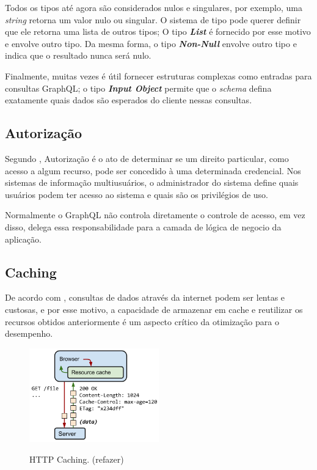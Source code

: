 Todos os tipos até agora são considerados nulos e singulares, por exemplo,  uma \textit{string} retorna um valor nulo ou singular. O sistema de tipo pode querer definir que ele retorna uma lista de outros tipos; O tipo \textit{\textbf{List}} é fornecido por esse motivo e envolve outro tipo. Da mesma forma, o tipo \textit{\textbf{Non-Null}} envolve outro tipo e indica que o resultado nunca será nulo.

Finalmente, muitas vezes é útil fornecer estruturas complexas como entradas para consultas GraphQL; o tipo \textit{\textbf{Input Object}} permite que o \textit{schema} defina exatamente quais dados são esperados do cliente nessas consultas.


\subsection{Autorização}

Segundo , Autorização é o ato de determinar se um direito particular, como acesso a algum recurso, pode ser concedido à uma determinada credencial. Nos sistemas de informação multiusuários, o administrador do sistema define quais usuários podem ter acesso ao sistema e quais são os privilégios de uso.

Normalmente o GraphQL não controla diretamente o controle de acesso, em vez disso, delega essa responsabilidade para a camada de lógica de negocio da aplicação. 


\subsection{Caching}

De acordo com , consultas de dados através da internet podem ser lentas e custosas, e por esse motivo, a capacidade de armazenar em cache e reutilizar os recursos obtidos anteriormente é um aspecto crítico da otimização para o desempenho.

\begin{figure}[htbp]
\centering
\includegraphics[width=0.5\textwidth]{figuras/cache-http.png}
\label{fig:cache-graph}
\caption{HTTP Caching. (refazer)}
\author{https://developers.google.com/web/fundamentals/performance/optimizing-content-efficiency/http-caching}
\end{figure}

